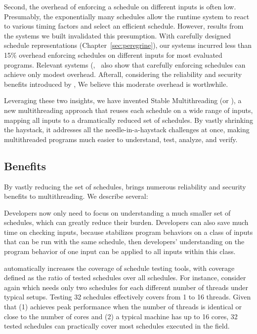 Second, the overhead of enforcing a schedule on different inputs is often low.
Presumably, the exponentially many schedules allow the
runtime system to react to various timing factors and select an
efficient schedule.  However, results from the \smt systems we built
invalidated this presumption.  With carefully designed schedule
representations (Chapter~\ref{sec:peregrine}), our systems incurred less than
15\%
overhead enforcing schedules on different inputs for most evaluated programs.
Relevant systems (\eg,~\cite{kendo:asplos09, determinator:osdi10} also show that
carefully enforcing schedules can achieve only modest overhead. Afterall,
considering the reliability and security benefits introduced by \smt, We believe
this moderate overhead is worthwhile.

Leveraging these two insights, we have invented Stable Multithreading (or \smt),
a new multithreading approach that reuses each schedule on a wide range of
inputs, mapping all inputs to a dramatically reduced set of schedules.
By vastly shrinking the haystack, it addresses all the needle-in-a-haystack
challenges at once, making multithreaded programs much easier to understand,
test, analyze, and verify.

\subsection{Benefits}

By vastly reducing the set of schedules, \smt brings numerous reliability
and security benefits to multithreading.  We describe several:

 Developers now only need to focus on understanding a much
smaller set of schedules, which can greatly reduce their burden. Developers can
also save much time on checking inputs, because \smt stabilizes program
behaviors on a class of inputs that can be run with the same schedule, then
developers' understanding on the program behavior of one input can be applied to
all inputs within this class.

 \smt automatically
increases the coverage of schedule testing tools, with coverage
defined as the ratio of tested schedules over all schedules.
For instance, consider \pbzip again which needs only two
schedules for each different number of threads under typical setups.  Testing 32
schedules effectively covers from 1 to 16 threads.  Given that (1) \pbzip
achieves peak performance when the number of threads is identical or close to
the number of cores and (2) a typical machine has up to 16 cores, 32 tested
schedules can practically cover most schedules executed in the field.

